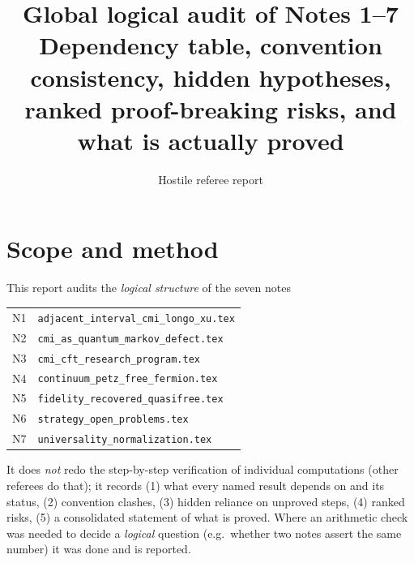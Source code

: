 \documentclass[11pt]{article}
\title{\vspace{-1.6cm}\color{navy}\bfseries Global logical audit of Notes 1--7\\[0.3em]
\large Dependency table, convention consistency, hidden hypotheses,\\ ranked proof-breaking risks, and what is actually proved}
\author{Hostile referee report}\date{}
\newcommand{\NI}{N1}\newcommand{\NII}{N2}\newcommand{\NIII}{N3}
\newcommand{\NIV}{N4}\newcommand{\NV}{N5}\newcommand{\NVI}{N6}\newcommand{\NVII}{N7}
\begin{document}
\maketitle
\vspace{-1.2em}

\section*{Scope and method}
This report audits the \emph{logical structure} of the seven notes
\begin{center}\small
\begin{tabular}{ll}
\NI & \texttt{adjacent\_interval\_cmi\_longo\_xu.tex}\\
\NII & \texttt{cmi\_as\_quantum\_markov\_defect.tex}\\
\NIII & \texttt{cmi\_cft\_research\_program.tex}\\
\NIV & \texttt{continuum\_petz\_free\_fermion.tex}\\
\NV & \texttt{fidelity\_recovered\_quasifree.tex}\\
\NVI & \texttt{strategy\_open\_problems.tex}\\
\NVII & \texttt{universality\_normalization.tex}
\end{tabular}
\end{center}
It does \emph{not} redo the step-by-step verification of individual computations (other referees do that); it records
(1) what every named result depends on and its status, (2) convention clashes, (3) hidden reliance on unproved steps,
(4) ranked risks, (5) a consolidated statement of what is proved.  Where an arithmetic check was needed to decide a
\emph{logical} question (e.g.\ whether two notes assert the same number) it was done and is reported.
\end{document}
